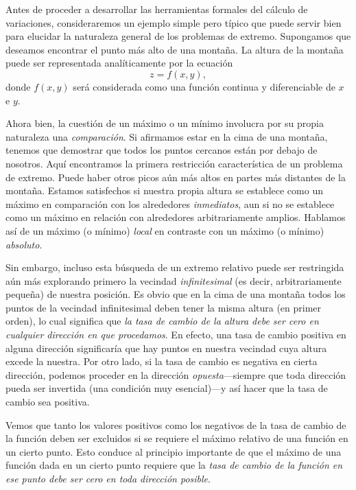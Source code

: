 \documentclass[12pt,a4paper]{book}
\begin{document}
Antes de proceder a desarrollar las herramientas formales del cálculo de variaciones, consideraremos un ejemplo simple pero típico que puede servir bien para elucidar la naturaleza general de los problemas de extremo. Supongamos que deseamos encontrar el punto más alto de una montaña. La altura de la montaña puede ser representada analíticamente por la ecuación
\begin{equation}
z = f(x, y), \tag{21.1}
\end{equation}
donde $f(x, y)$ será considerada como una función continua y diferenciable de $x$ e $y$.

Ahora bien, la cuestión de un máximo o un mínimo involucra por su propia naturaleza una \textit{comparación}. Si afirmamos estar en la cima de una montaña, tenemos que demostrar que todos los puntos cercanos están por debajo de nosotros. Aquí encontramos la primera restricción característica de un problema de extremo. Puede haber otros picos aún más altos en partes más distantes de la montaña. Estamos satisfechos si nuestra propia altura se establece como un máximo en comparación con los alrededores \textit{inmediatos}, aun si no se establece como un máximo en relación con alrededores arbitrariamente amplios. Hablamos así de un máximo (o mínimo) \textit{local} en contraste con un máximo (o mínimo) \textit{absoluto}.

Sin embargo, incluso esta búsqueda de un extremo relativo puede ser restringida aún más explorando primero la vecindad \textit{infinitesimal} (es decir, arbitrariamente pequeña) de nuestra posición. Es obvio que en la cima de una montaña todos los puntos de la vecindad infinitesimal deben tener la misma altura (en primer orden), lo cual significa que \textit{la tasa de cambio de la altura debe ser cero en cualquier dirección en que procedamos}. En efecto, una tasa de cambio positiva en alguna dirección significaría que hay puntos en nuestra vecindad cuya altura excede la nuestra. Por otro lado, si la tasa de cambio es negativa en cierta dirección, podemos proceder en la dirección \textit{opuesta}---siempre que toda dirección pueda ser invertida (una condición muy esencial)---y así hacer que la tasa de cambio sea positiva.

Vemos que tanto los valores positivos como los negativos de la tasa de cambio de la función deben ser excluidos si se requiere el máximo relativo de una función en un cierto punto. Esto conduce al principio importante de que el máximo de una función dada en un cierto punto requiere que la \textit{tasa de cambio de la función en ese punto debe ser cero en toda dirección posible}.
\end{document}
